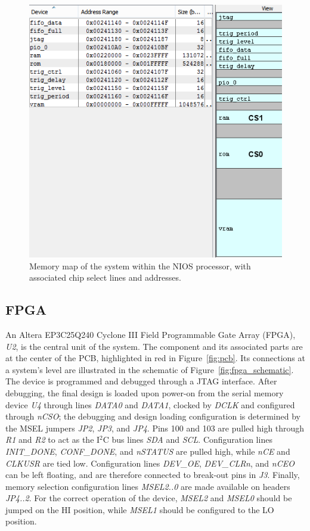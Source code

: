 \documentclass[titlepage]{scrartcl}
\begin{document}
	\begin{figure}[h!]
	\includegraphics[width=\textwidth]{img/memory_map.png}
                	\caption{Memory map of the system within the NIOS processor, with associated chip select lines and addresses.}
               	\label{fig:memory_map}
	\end{figure}

	\clearpage

	\subsection{FPGA \label{sec:fpga}}
	An Altera EP3C25Q240 Cyclone III Field Programmable Gate Array (FPGA), \textit{U2}, is the central unit of the system. The component and its associated parts are at the center of the PCB, highlighted in red in Figure~\ref{fig:pcb}. Its connections at a system's level are illustrated in the schematic of Figure~\ref{fig:fpga_schematic}. The device is programmed and debugged through a JTAG interface. After debugging, the final design is loaded upon power-on from the serial memory device \textit{U4} through lines \textit{DATA0} and \textit{DATA1}, clocked by \textit{DCLK} and configured through \textit{nCSO}; the debugging and design loading configuration is determined by the MSEL jumpers \textit{JP2}, \textit{JP3}, and \textit{JP4}. Pins 100 and 103 are pulled high through \textit{R1} and \textit{R2} to act as the I$^2$C bus lines \textit{SDA} and \textit{SCL}. Configuration lines \textit{INIT\_DONE}, \textit{CONF\_DONE}, and \textit{nSTATUS} are pulled high, while \textit{nCE} and \textit{CLKUSR} are tied low. Configuration lines \textit{DEV\_OE}, \textit{DEV\_CLRn}, and \textit{nCEO} can be left floating, and are therefore connected to break-out pins in \textit{J3}. Finally, memory selection configuration lines \textit{MSEL2..0} are made available on headers \textit{JP4..2}. For the correct operation of the device, \textit{MSEL2} and \textit{MSEL0} should be jumped on the HI position, while \textit{MSEL1} should be configured to the LO position.\\
\end{document}
